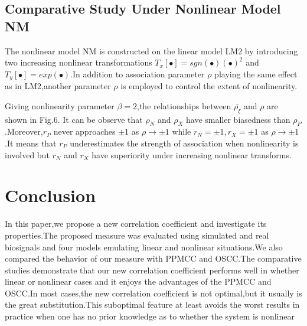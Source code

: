\documentclass[journal]{IEEEtran}
\begin{document}
  \subsection{Comparative Study Under Nonlinear Model NM}
  The nonlinear model NM is constructed on the linear model LM2 by introducing two increasing nonlinear transformations $T_{x}[\bullet]=sgn(\bullet)(\bullet)^{2}$ and $T_{y}[\bullet]=exp(\bullet)$.In addition to association parameter $\rho$ playing the same effect as in LM2,another parameter $\rho$ is employed to control the extent of nonlinearity.
  
  Giving nonlinearity parameter $\beta=2$,the relationships between $\bar{\rho_{\xi}}$ and $\rho$ are shown in Fig.6. It can be observe that $\rho_{N}$ and $\rho_{X}$ have smaller biasedness than $\rho_{P}$.Moreover,$r_{P}$ never approaches $\pm1$ as $\rho\rightarrow\pm1$ while $r_{N}=\pm1,r_{X}=\pm1$ as $\rho\rightarrow\pm1$.It means that $r_{P}$ underestimates the strength of association when nonlinearity is involved but $r_{N}$ and $r_{X}$ have superiority under increasing nonlinear transforms.
  

\section{Conclusion}\label{sec:conclusion}
    In this paper,we propose a new correlation coefficient and investigate its properties.The proposed measure was evaluated using simulated and real biosignals and four models emulating linear and nonlinear situations.We also compared the behavior of our measure with PPMCC and OSCC.The comparative studies demonstrate that our new correlation coefficient performs well in whether linear or nonlinear cases and it enjoys the advantages of the PPMCC and OSCC.In most cases,the new correlation coefficient is not optimal,but it usually is the great substitution.This suboptimal feature at least avoids the worst results in practice when one has no prior knowledge as to whether the system is nonlinear


\ifCLASSOPTIONcaptionsoff
  \newpage
\fi




\end{document}
